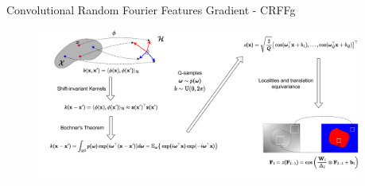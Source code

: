 \documentclass[aspectratio=169]{beamer}
\providecommand{\mat}[1]{{\bm{#1}}}
\providecommand{\ve}[1]{{\bm{#1}}}
\begin{document}







\begin{frame}{Convolutional Random Fourier Features Gradient - CRFFg}
    \begin{figure}
        \centering \includegraphics[trim={1.1cm 0 0 0},clip, width=0.95\textwidth]{Figures/CRFFg.pdf}
    \end{figure}
\end{frame}
\end{document}
